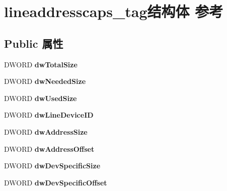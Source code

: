 \hypertarget{structlineaddresscaps__tag}{}\section{lineaddresscaps\+\_\+tag结构体 参考}
\label{structlineaddresscaps__tag}
\subsection*{Public 属性}
\begin{DoxyCompactItemize}
\item 
\mbox{\label{structlineaddresscaps__tag_a76d9634c892c5643be31f399def3e107}} 
D\+W\+O\+RD {\bfseries dw\+Total\+Size}
\item 
\mbox{\label{structlineaddresscaps__tag_a116a4f37d869e0a8e910a61ef7fc60b7}} 
D\+W\+O\+RD {\bfseries dw\+Needed\+Size}
\item 
\mbox{\label{structlineaddresscaps__tag_a533d4d63e9bed385012252de5f3cd21b}} 
D\+W\+O\+RD {\bfseries dw\+Used\+Size}
\item 
\mbox{\label{structlineaddresscaps__tag_a586d3cd7c4fb30ac5c70ece865d168cc}} 
D\+W\+O\+RD {\bfseries dw\+Line\+Device\+ID}
\item 
\mbox{\label{structlineaddresscaps__tag_afd06504d9467e2888d8b8aa274d4942d}} 
D\+W\+O\+RD {\bfseries dw\+Address\+Size}
\item 
\mbox{\label{structlineaddresscaps__tag_ab5390def98ab024287293845fd944d2b}} 
D\+W\+O\+RD {\bfseries dw\+Address\+Offset}
\item 
\mbox{\label{structlineaddresscaps__tag_a817f7d9b63a36b6a7675ac9a0bc80e8e}} 
D\+W\+O\+RD {\bfseries dw\+Dev\+Specific\+Size}
\item 
\mbox{\label{structlineaddresscaps__tag_a34f742cc0b8483ec83145f005e8679d9}} 
D\+W\+O\+RD {\bfseries dw\+Dev\+Specific\+Offset}
\item 
\mbox{\label{structlineaddresscaps__tag_a50c8267c9ab41626904bc88cccb9b38c}} 

\end{DoxyCompactItemize}
